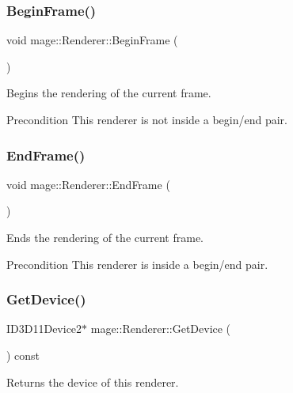 \subsubsection{\texorpdfstring{Begin\+Frame()}{BeginFrame()}}
{\footnotesize\ttfamily void mage\+::\+Renderer\+::\+Begin\+Frame (\begin{DoxyParamCaption}{ }\end{DoxyParamCaption})}

Begins the rendering of the current frame.

\begin{DoxyPrecond}{Precondition}
This renderer is not inside a begin/end pair. 
\end{DoxyPrecond}
\hypertarget{classmage_1_1_renderer_a38be3325e99a447340a048db19e6cf07}{}\label{classmage_1_1_renderer_a38be3325e99a447340a048db19e6cf07} 
\subsubsection{\texorpdfstring{End\+Frame()}{EndFrame()}}
{\footnotesize\ttfamily void mage\+::\+Renderer\+::\+End\+Frame (\begin{DoxyParamCaption}{ }\end{DoxyParamCaption})}

Ends the rendering of the current frame.

\begin{DoxyPrecond}{Precondition}
This renderer is inside a begin/end pair. 
\end{DoxyPrecond}
\hypertarget{classmage_1_1_renderer_a9510b8784447ed0fa9b43e7a4bf1fc80}{}\label{classmage_1_1_renderer_a9510b8784447ed0fa9b43e7a4bf1fc80} 
\subsubsection{\texorpdfstring{Get\+Device()}{GetDevice()}}
{\footnotesize\ttfamily I\+D3\+D11\+Device2$\ast$ mage\+::\+Renderer\+::\+Get\+Device (\begin{DoxyParamCaption}{ }\end{DoxyParamCaption}) const\hspace{0.3cm}{\ttfamily [noexcept]}}

Returns the device of this renderer.

